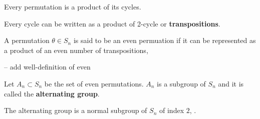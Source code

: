 \begin{lemma}
    Every permutation is a product of its cycles.
\end{lemma}

\begin{lemma}
    Every cycle can be written as a product of 2-cycle or \textbf{transpositions}.
\end{lemma}

\begin{definition}
    A permutation \(\theta \in S_n\) is said to be an even permuation if it can be represented as a product of an even number of transpositions, 
\end{definition}

-- add well-definition of even

Let \(A_n \subset S_n\) be the set of even permutations. \(A_n\) is a subgroup of \(S_n\) and it is called the \textbf{alternating group}. 
\begin{lemma}
    The alternating group is a normal subgroup of \(S_n\) of index \(2\), .
\end{lemma}